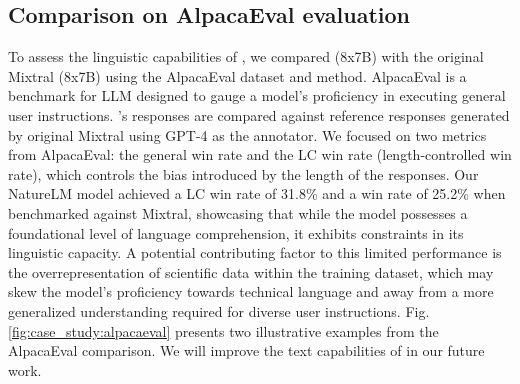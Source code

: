 \subsection{Comparison on AlpacaEval evaluation}\label{sec:alpahaeval}
To assess the linguistic capabilities of \ourM{}, we compared \ourM{} (8x7B) with the original Mixtral  (8x7B) using the AlpacaEval \cite{dubois2024length} dataset and method. AlpacaEval is a benchmark for LLM designed to gauge a model's proficiency in executing general user instructions. \ourM{}'s responses are compared against reference responses generated by original Mixtral using GPT-4 as the annotator. We focused on two metrics from AlpacaEval: the general win rate and the LC win rate (length-controlled win rate), which controls the bias introduced by the length of the responses. Our NatureLM model achieved a LC win rate of 31.8\% and a win rate of 25.2\% when benchmarked against Mixtral, showcasing that while the model possesses a foundational level of language comprehension, it exhibits constraints in its linguistic capacity.   A potential contributing factor to this limited performance is the overrepresentation of scientific data within the training dataset, which may skew the model's proficiency towards technical language and away from a more generalized understanding required for diverse user instructions. Fig. \ref{fig:case_study:alpacaeval} presents two illustrative examples from the AlpacaEval comparison. We will improve the text capabilities of \ourM{} in our future work. 
